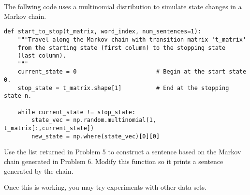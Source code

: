 

\begin{problem}
The follwing code uses a multinomial distribution to simulate state changes in a Markov chain.
\begin{lstlisting}
def start_to_stop(t_matrix, word_index, num_sentences=1):
	"""Travel along the Markov chain with transition matrix 't_matrix'
	from the starting state (first column) to the stopping state
	(last column).
	"""
	current_state = 0						# Begin at the start state 0.
	stop_state = t_matrix.shape[1] 			# End at the stopping state n.

	while current_state != stop_state:
		state_vec = np.random.multinomial(1, t_matrix[:,current_state])
		new_state = np.where(state_vec)[0][0]
\end{lstlisting}

Use the list returned in Problem 5 to construct a sentence based on the Markov chain generated in Problem 6.
Modify this function so it prints a sentence generated by the chain.

Once this is working, you may try experiments with other data sets.
\end{problem}

